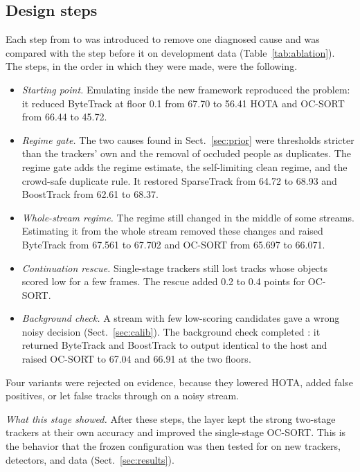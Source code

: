 \subsection{Design steps}\label{sec:steps}
Each step from \aob{} to \scl{} was introduced to remove one diagnosed cause
and was compared with the step before it on development data
(Table~\ref{tab:ablation}). The steps, in the order in which they were made,
were the following.
\begin{itemize}
\item \emph{Starting point.} Emulating \aob{} inside the new framework
      reproduced the problem: it reduced ByteTrack at floor 0.1 from 67.70 to
      56.41 HOTA and OC-SORT from 66.44 to 45.72.
\item \emph{Regime gate.} The two causes found in Sect.~\ref{sec:prior} were
      thresholds stricter than the trackers' own and the removal of occluded
      people as duplicates. The regime gate adds the regime
      estimate, the self-limiting clean regime, and the crowd-safe duplicate
      rule. It restored SparseTrack from 64.72 to 68.93 and BoostTrack from
      62.61 to 68.37.
\item \emph{Whole-stream regime.} The regime still changed in the middle of
      some streams. Estimating it from the whole stream removed these changes
      and raised ByteTrack from 67.561 to 67.702 and OC-SORT from 65.697 to
      66.071.
\item \emph{Continuation rescue.} Single-stage trackers still lost tracks
      whose objects scored low for a few frames. The rescue added 0.2 to 0.4
      points for OC-SORT.
\item \emph{Background check.} A stream with few low-scoring candidates gave a
      wrong noisy decision (Sect.~\ref{sec:calib}). The background check
      completed \scl{}: it returned ByteTrack and BoostTrack to output
      identical to the host and raised OC-SORT to 67.04 and 66.91 at the two
      floors.
\end{itemize}
Four variants were rejected on evidence, because they lowered HOTA, added
false positives, or let false tracks through on a noisy stream.

\emph{What this stage showed.} After these steps, the layer kept the strong
two-stage trackers at their own accuracy and improved the single-stage
OC-SORT. This is the behavior that the frozen configuration was then tested
for on new trackers, detectors, and data (Sect.~\ref{sec:results}).



